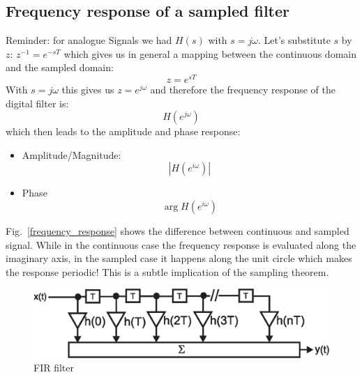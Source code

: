 \documentclass[12pt,a4paper]{article}
\begin{document}
\subsection{Frequency response of a sampled filter}
Reminder: for analogue Signals we had $H(s)$ with $s=j \omega$.
Let's substitute $s$ by $z$: $z^{-1} = e^{-sT}$ which
gives us in general a mapping between the continuous domain and
the sampled domain:
\begin{equation}
z = e^{sT}
\label{mappingsz}
\end{equation}
With $s=j \omega$ this gives us $z = e^{j \omega}$ and therefore
the frequency response of the digital filter is:
\begin{equation}
H(e^{j \omega})
\end{equation}
which then leads to the amplitude and phase response:
\begin{itemize}
\item Amplitude/Magnitude: 
\begin{equation}
|H(e^{i \omega})|
\end{equation}
\item Phase
\begin{equation}
\arg H(e^{i \omega})
\end{equation}
\end{itemize}
Fig.~\ref{frequency_response} shows the difference between
continuous and sampled signal. While in the continuous case
the frequency response
is evaluated along the imaginary axis, in the sampled case
it happens along the unit circle which makes the response
periodic! This is a subtle implication of the sampling theorem.



\begin{figure}[!hbt]
\begin{center}
\mbox{\includegraphics[width=\linewidth]{fir}}
\caption{FIR filter \label{FIRfilter}}
\end{center}
\end{figure}



\clearpage
\end{document}
